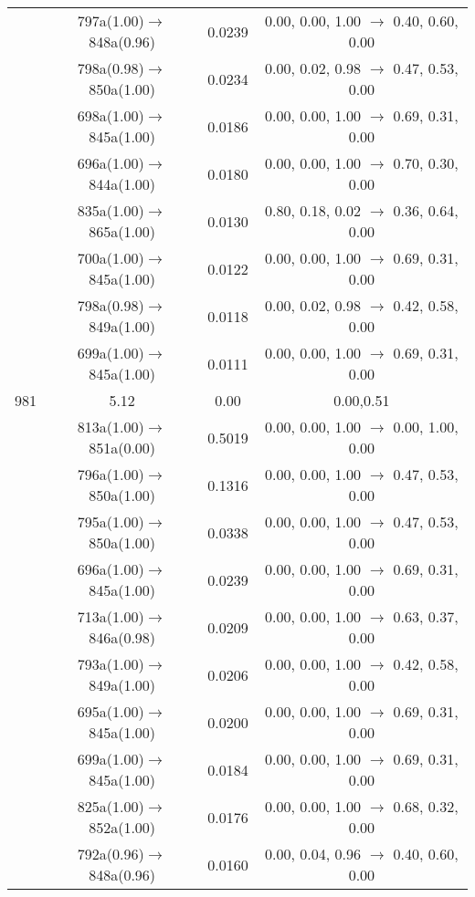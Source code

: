 \documentclass[10pt,a4paper]{article}
\begin{document}
\begin{longtable}{c|c|c|c}
 	& 797a(1.00)$\rightarrow$848a(0.96) &	 0.0239 &	 0.00, 0.00, 1.00 $\rightarrow$ 0.40, 0.60, 0.00 \\ 
 	& 798a(0.98)$\rightarrow$850a(1.00) &	 0.0234 &	 0.00, 0.02, 0.98 $\rightarrow$ 0.47, 0.53, 0.00 \\ 
 	& 698a(1.00)$\rightarrow$845a(1.00) &	 0.0186 &	 0.00, 0.00, 1.00 $\rightarrow$ 0.69, 0.31, 0.00 \\ 
 	& 696a(1.00)$\rightarrow$844a(1.00) &	 0.0180 &	 0.00, 0.00, 1.00 $\rightarrow$ 0.70, 0.30, 0.00 \\ 
 	& 835a(1.00)$\rightarrow$865a(1.00) &	 0.0130 &	 0.80, 0.18, 0.02 $\rightarrow$ 0.36, 0.64, 0.00 \\ 
 	& 700a(1.00)$\rightarrow$845a(1.00) &	 0.0122 &	 0.00, 0.00, 1.00 $\rightarrow$ 0.69, 0.31, 0.00 \\ 
 	& 798a(0.98)$\rightarrow$849a(1.00) &	 0.0118 &	 0.00, 0.02, 0.98 $\rightarrow$ 0.42, 0.58, 0.00 \\ 
 	& 699a(1.00)$\rightarrow$845a(1.00) &	 0.0111 &	 0.00, 0.00, 1.00 $\rightarrow$ 0.69, 0.31, 0.00 \\ 
 \hline981 &	 5.12 &	 0.00 &	 0.00,0.51 \\ 
  	& 813a(1.00)$\rightarrow$851a(0.00) &	 0.5019 &	 0.00, 0.00, 1.00 $\rightarrow$ 0.00, 1.00, 0.00 \\ 
 	& 796a(1.00)$\rightarrow$850a(1.00) &	 0.1316 &	 0.00, 0.00, 1.00 $\rightarrow$ 0.47, 0.53, 0.00 \\ 
 	& 795a(1.00)$\rightarrow$850a(1.00) &	 0.0338 &	 0.00, 0.00, 1.00 $\rightarrow$ 0.47, 0.53, 0.00 \\ 
 	& 696a(1.00)$\rightarrow$845a(1.00) &	 0.0239 &	 0.00, 0.00, 1.00 $\rightarrow$ 0.69, 0.31, 0.00 \\ 
 	& 713a(1.00)$\rightarrow$846a(0.98) &	 0.0209 &	 0.00, 0.00, 1.00 $\rightarrow$ 0.63, 0.37, 0.00 \\ 
 	& 793a(1.00)$\rightarrow$849a(1.00) &	 0.0206 &	 0.00, 0.00, 1.00 $\rightarrow$ 0.42, 0.58, 0.00 \\ 
 	& 695a(1.00)$\rightarrow$845a(1.00) &	 0.0200 &	 0.00, 0.00, 1.00 $\rightarrow$ 0.69, 0.31, 0.00 \\ 
 	& 699a(1.00)$\rightarrow$845a(1.00) &	 0.0184 &	 0.00, 0.00, 1.00 $\rightarrow$ 0.69, 0.31, 0.00 \\ 
 	& 825a(1.00)$\rightarrow$852a(1.00) &	 0.0176 &	 0.00, 0.00, 1.00 $\rightarrow$ 0.68, 0.32, 0.00 \\ 
 	& 792a(0.96)$\rightarrow$848a(0.96) &	 0.0160 &	 0.00, 0.04, 0.96 $\rightarrow$ 0.40, 0.60, 0.00 \\ 

\end{longtable}
\end{document}
